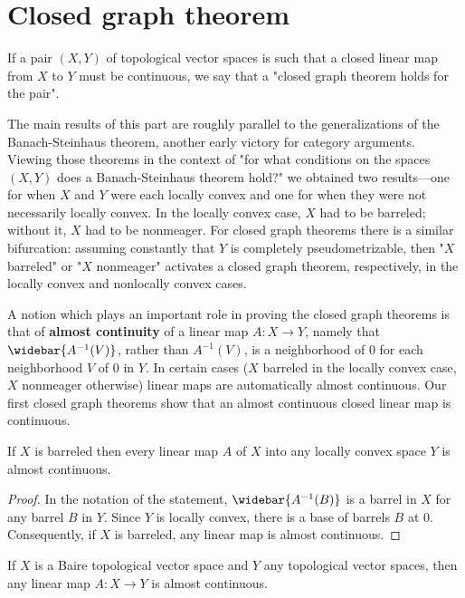 \section{Closed graph theorem}
If a pair $(X,Y)$ of topological vector spaces is such that a closed linear map from $X$ to $Y$ must be continuous, we say that a "closed graph theorem holds for the pair".\par
The main results of this part are roughly parallel to the generalizations of the Banach-Steinhaus theorem, another early victory for category arguments. Viewing those theorems in the context of "for what conditions on the spaces $(X,Y)$ does a Banach-Steinhaus theorem hold?" we obtained two results---one for when $X$ and $Y$ were each locally convex and one for when they were not necessarily locally convex. In the locally convex case, $X$ had to be barreled; without it, $X$ had to be nonmeager. For closed graph theorems there is a similar bifurcation: assuming constantly that $Y$ is completely pseudometrizable, then "$X$ barreled" or "$X$ nonmeager" activates a closed graph theorem, respectively, in the locally convex and nonlocally convex cases.\par
A notion which plays an important role in proving the closed graph theorems is that of \textbf{almost continuity} of a linear map $A:X\to Y$, namely that $\widebar{A^{-1}(V)}$, rather than $A^{-1}(V)$, is a neighborhood of $0$ for each neighborhood $V$ of $0$ in $Y$. In certain cases ($X$ barreled in the locally convex case, $X$ nonmeager otherwise) linear maps are automatically almost continuous. Our first closed graph theorems show that an almost continuous closed linear map is continuous.
\begin{proposition}\label{LCS barreled linear map is almost continuous}
If $X$ is barreled then every linear map $A$ of $X$ into any locally convex space $Y$ is almost continuous.
\end{proposition}
\begin{proof}
In the notation of the statement, $\widebar{A^{-1}(B)}$ is a barrel in $X$ for any barrel $B$ in $Y$. Since $Y$ is locally convex, there is a base of barrels $B$ at $0$. Consequently, if $X$ is barreled, any linear map is almost continuous.
\end{proof}
\begin{proposition}\label{TVS Baire linear map is almost continuous}
If $X$ is a Baire topological vector space and $Y$ any topological vector spaces, then any linear map $A:X\to Y$ is almost continuous.
\end{proposition}
